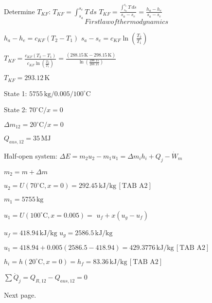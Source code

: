 Determine \( T_{KF} \):  
\( T_{KF} = \int_{s_a}^{s_e} T \, ds \)  
\( T_{KF} = \frac{\int_{s_a}^{s_e} T \, ds}{s_a - s_e} = \frac{h_a - h_e}{s_a - s_e} \) \[First law of thermodynamics\]  

\( h_a - h_e = c_{KF} (T_2 - T_1) \)  
\( s_a - s_e = c_{KF} \ln \left( \frac{T_2}{T_1} \right) \)  

\( T_{KF} = \frac{c_{KF} (T_2 - T_1)}{c_{KF} \ln \left( \frac{T_2}{T_1} \right)} = \frac{(288.15 \, \text{K} - 298.15 \, \text{K})}{\ln \left( \frac{298.15}{288.15} \right)} \)  

\( T_{KF} = 293.12 \, \text{K} \)

State 1:  
\( 5755 \, \text{kg} / 0.005 / 100^\circ \text{C} \)  

State 2:  
\( 70^\circ \text{C} / x = 0 \)  

\( \Delta m_{12} = 20^\circ \text{C} / x = 0 \)  

\( Q_{aus,12} = 35 \, \text{MJ} \)  

Half-open system:  
\( \Delta E = m_2 u_2 - m_1 u_1 = \Delta m_i h_i + Q_{j} - \dot{W}_{m} \)  

\( m_2 = m + \Delta m \)  

\( u_2 = U(70^\circ \text{C}, x = 0) = 292.45 \, \text{kJ/kg} \, [\text{TAB A2}] \)  

\( m_1 = 5755 \, \text{kg} \)  

\( u_1 = U(100^\circ \text{C}, x = 0.005) = \)  
\( u_f + x (u_g - u_f) \)  

\( u_f = 418.94 \, \text{kJ/kg} \)  
\( u_g = 2586.5 \, \text{kJ/kg} \)  

\( u_1 = 418.94 + 0.005 (2586.5 - 418.94) = 429.3776 \, \text{kJ/kg} \, [\text{TAB A2}] \)  

\( h_i = h(20^\circ \text{C}, x = 0) = h_f = 83.36 \, \text{kJ/kg} \, [\text{TAB A2}] \)  

\( \sum \dot{Q}_j = Q_{R,12} - Q_{aus,12} = 0 \)  

Next page.
